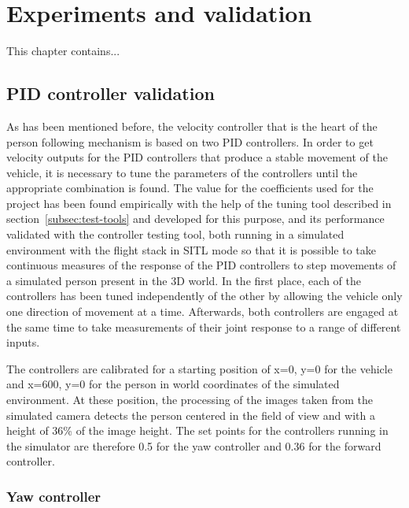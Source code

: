 \chapter{Experiments and validation}
\label{chap:validation}

This chapter contains...

\section{PID controller validation}
\label{sec:test-1-pid}



As has been mentioned before, the velocity controller that is the heart of the person following mechanism is based on two PID controllers.
In order to get velocity outputs for the PID controllers that produce a stable movement of the vehicle, it is necessary to tune the parameters of the controllers until the appropriate combination is found.
The value for the coefficients used for the project has been found empirically with the help of the tuning tool described in section~\ref{subsec:test-tools} and developed for this purpose, and its performance validated with the controller testing tool, both running in a simulated environment with the flight stack in SITL mode so that it is possible to take continuous measures of the response of the PID controllers to step movements of a simulated person present in the 3D world.
In the first place, each of the controllers has been tuned independently of the other by allowing the vehicle only one direction of movement at a time.
Afterwards, both controllers are engaged at the same time to take measurements of their joint response to a range of different inputs.

The controllers are calibrated for a starting position of x=0, y=0 for the vehicle and x=600, y=0 for the person in world coordinates of the simulated environment.
At these position, the processing of the images taken from the simulated camera detects the person centered in the field of view and with a height of 36\% of the image height.
The set points for the controllers running in the simulator are therefore 0.5 for the yaw controller and 0.36 for the forward controller.

\subsection{Yaw controller}

